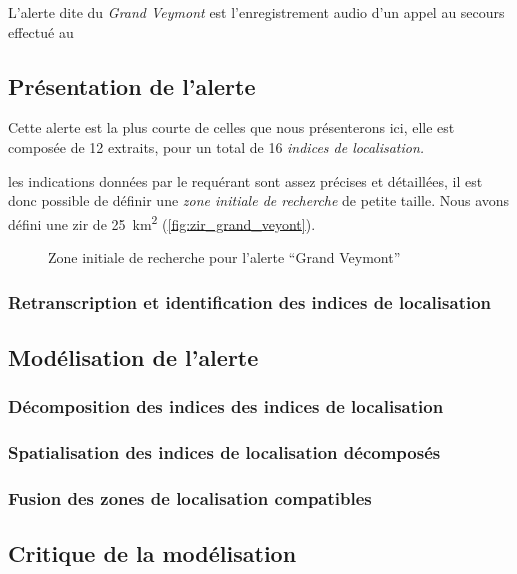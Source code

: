 L'alerte dite du \emph{Grand Veymont} est l'enregistrement audio d'un
appel au secours effectué au 

\subsection{Présentation de l'alerte}
\label{subsec:9-2-1}

Cette alerte est la plus courte de celles que nous présenterons ici,
elle est composée de 12 extraits, pour un total de 16 \emph{indices de
  localisation.}


les indications données par le requérant sont assez précises et
détaillées, il est donc possible de définir une \emph{zone initiale de
  recherche} de petite taille. Nous avons défini une \ac{zir} de
\SI{25}{\kilo\meter\squared} (\autoref{fig:zir_grand_veyont}).

\begin{figure}
  \centering
  
  \caption{Zone initiale de recherche pour l'alerte \enquote{Grand Veymont}}
  \label{fig:zir_grand_veyont}
\end{figure}



\subsubsection{Retranscription et identification des indices de localisation}
\label{subsec:9-2-1-1}

\subsection{Modélisation de l'alerte}
\label{subsec:9-2-2}


\subsubsection{Décomposition des indices des indices de localisation}
\label{subsec:9-2-2-2}

\subsubsection{Spatialisation des indices de localisation décomposés}
\label{subsec:9-2-2-3}

\subsubsection{Fusion des zones de localisation compatibles}
\label{subsec:9-2-2-4}

\subsection{Critique de la modélisation}
\label{subsec:9-2-3}

